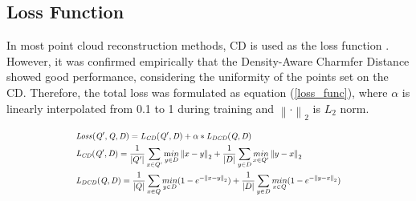 \documentclass{article}
\begin{document}
\subsection{Loss Function} 
 \quad In most point cloud reconstruction methods, CD is used as the loss function \cite{nguyen2019graphx,wen2020point,yu2021pointr}. However, it was confirmed empirically that the Density-Aware Charmfer Distance showed good performance, considering the uniformity of the points set on the CD. Therefore, the total loss was formulated as equation (\ref{loss_func}), where $\alpha$ is linearly interpolated from 0.1 to 1 during training and $\left\| \cdot\right\|_{2}$ is $L_{2}$ norm.
 
\begin{center}
\begin{equation}\label{loss_func}
\scalebox{0.75}{$\begin{aligned}
    &\mathit{Loss(Q',Q,D)} = \mathit{L_{CD}(Q',D)} + \alpha *\mathit{L_{DCD}(Q,D)} \\ 
    &\mathit{L_{CD}(Q',D)} = \frac{1}{\left|Q'\right|}\sum_{x\in Q'} \underset{{y\in D}}{\mathrm min}\left\|x-y\right\|_2 + \frac{1}{\left|D\right|}\sum_{y\in D} \underset{x\in Q'}{min}\left\|y-x\right\|_2  \\
    &\mathit{L_{DCD}(Q,D)} = \frac{1}{\left|Q\right|}\sum_{x\in Q}^{}\underset{y\in D}{min}(1 - e^{-\left\|x-y\right\|_2})+\frac{1}{\left|D\right|}\sum_{y\in D}^{}\underset{x\in Q}{min}(1 - e^{-\left\|y-x\right\|_2})
\end{aligned}$}
\end{equation}
\end{center}
\end{document}
